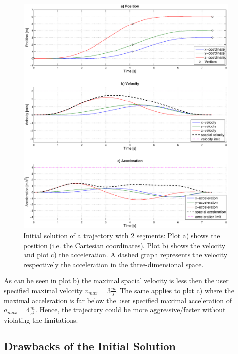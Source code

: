 \begin{figure}[h]
   \centering
   \includegraphics[trim = 32mm 30mm 30mm 20mm,clip,width=0.984\textwidth]{pics/2SegInit7s43.eps}
   \caption{Initial solution of a trajectory with 2 segments: Plot a) shows the position (i.e. the Cartesian coordinates). Plot b) shows the velocity and plot c) the acceleration. A dashed graph represents the velocity respectively the acceleration in the three-dimensional space.}
   \label{pic:initialSolution}
\end{figure}

As can be seen in plot b) the maximal spacial velocity is less then the user specified maximal velocity $v_{max} = 3\frac{m}{s}$. The same applies to plot c) where the maximal acceleration is far below the user specified maximal acceleration of $a_{max} = 4 \frac{m}{s^2}$. Hence, the trajectory could be more aggressive/faster without violating the limitations. \newline

\subsection{Drawbacks of the Initial Solution}\label{sec:drawbackInitial}



